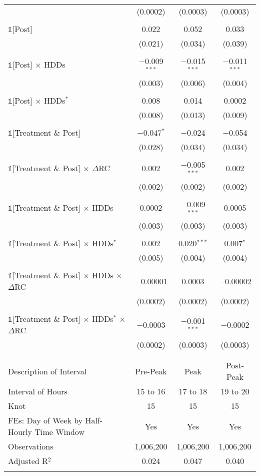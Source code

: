 \begin{table}[!htbp]
\begin{tabular}{@{\extracolsep{95pt}}lccc}
  & (0.0002) & (0.0003) & (0.0003) \\ 
  & & & \\ 
 $\mathbb{1}$[Post] & 0.022 & 0.052 & 0.033 \\ 
  & (0.021) & (0.034) & (0.039) \\ 
  & & & \\ 
 $\mathbb{1}$[Post] $\times$ HDDs & $-$0.009$^{***}$ & $-$0.015$^{***}$ & $-$0.011$^{***}$ \\ 
  & (0.003) & (0.006) & (0.004) \\ 
  & & & \\ 
 $\mathbb{1}$[Post] $\times$ HDDs$^{*}$ & 0.008 & 0.014 & 0.0002 \\ 
  & (0.008) & (0.013) & (0.009) \\ 
  & & & \\ 
 $\mathbb{1}$[Treatment \& Post] & $-$0.047$^{*}$ & $-$0.024 & $-$0.054 \\ 
  & (0.028) & (0.034) & (0.034) \\ 
  & & & \\ 
 $\mathbb{1}$[Treatment \& Post] $\times$ $\Delta$RC & 0.002 & $-$0.005$^{***}$ & 0.002 \\ 
  & (0.002) & (0.002) & (0.002) \\ 
  & & & \\ 
 $\mathbb{1}$[Treatment \& Post] $\times$ HDDs & 0.0002 & $-$0.009$^{***}$ & 0.0005 \\ 
  & (0.003) & (0.003) & (0.003) \\ 
  & & & \\ 
 $\mathbb{1}$[Treatment \& Post] $\times$ HDDs$^{*}$ & 0.002 & 0.020$^{***}$ & 0.007$^{*}$ \\ 
  & (0.005) & (0.004) & (0.004) \\ 
  & & & \\ 
 $\mathbb{1}$[Treatment \& Post] $\times$ HDDs $\times$ $\Delta$RC & $-$0.00001 & 0.0003 & $-$0.00002 \\ 
  & (0.0002) & (0.0002) & (0.0002) \\ 
  & & & \\ 
 $\mathbb{1}$[Treatment \& Post] $\times$ HDDs$^{*}$ $\times$ $\Delta$RC & $-$0.0003 & $-$0.001$^{***}$ & $-$0.0002 \\ 
  & (0.0002) & (0.0003) & (0.0003) \\ 
  & & & \\ 
\hline \\[-1.8ex] 
Description of Interval & Pre-Peak & Peak & Post-Peak \\ 
Interval of Hours & 15 to 16 & 17 to 18 & 19 to 20 \\ 
Knot & 15 & 15 & 15 \\ 
FEs: Day of Week by Half-Hourly Time Window & Yes & Yes & Yes \\ 
Observations & 1,006,200 & 1,006,200 & 1,006,200 \\ 
Adjusted R$^{2}$ & 0.024 & 0.047 & 0.040 \\ 
\hline 
\hline \\[-1.8ex] 
\end{tabular} 
\end{table} 

